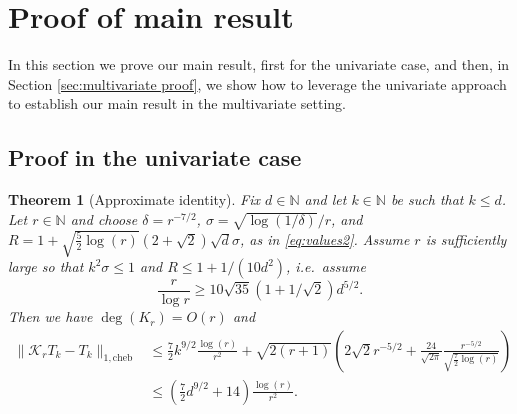 \documentclass[11pt]{article}
\newcommand{\N}{\mathbb{N}}
\newtheorem{theorem}{Theorem}
\theoremstyle{definition}
\newcommand{\const}[1]{1/(10 #1^2)}
\newcommand{\cheb}{{1,\mathrm{cheb}}}
\begin{document}
\section{Proof of main result }
\label{sec:main result}
In this section we prove our main result, first for the univariate case, and then, in  Section \ref{sec:multivariate proof}, we
show how to leverage the univariate approach to establish our main result in the multivariate setting.


\subsection{Proof in the univariate case}
\label{sec:proof uni}


\begin{theorem}[Approximate identity] \label{thrm:approxIDuni}
Fix $d \in \N$ and let $k \in \N$ be such that $k \leq d$. Let $r \in \N$ and choose $\delta = r^{-7/2}$,
 $\sigma = \sqrt{\log(1/\delta)}/r$, and $R=1 + \sqrt{\frac52\log(r)}(2+\sqrt{2})\sqrt{d}\sigma$, as in \cref{eq:values2}.
  Assume $r$ is sufficiently large so that {$k^2 \sigma \leq 1$} and $R \leq 1+ \const{d}$, i.e.\ assume
\begin{equation}
\label{eq:rbounds}
\frac{r}{\log r} \ge {10\sqrt{35}\left(1+ 1/\sqrt{2}\right)d^{5/2}.}
\end{equation}
Then we have $\deg(K_r) = O(r)$ and
\begin{align*}
\|\mathcal K_r T_k - T_k \|_\cheb &\leq {\frac{7}{2}k^{9/2}} \frac{\log(r)}{r^2} + \sqrt{2(r+1)} \left(2 \sqrt{2} r^{-5/2} + \frac{24}{\sqrt{2\pi}} \frac{r^{-5/2}}{\sqrt{\frac{7}{2}\log(r)}} \right) \\
& \le
\left( {\frac{7}{2}d^{9/2}} + 14\right)\frac{\log(r)}{r^2}.
\end{align*}
\end{theorem}
\end{document}
